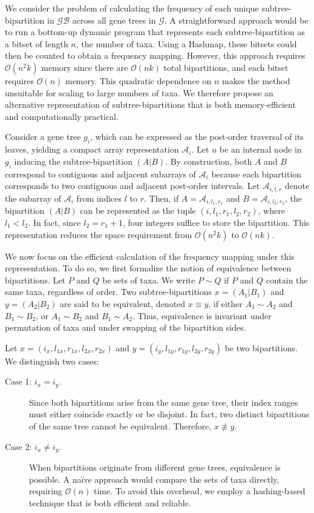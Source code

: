 \documentclass[runningheads]{llncs}
\begin{document}
We consider the problem of calculating the frequency of each unique subtree-bipartition in $\mathcal{GB}$ across all gene trees in $\mathcal{G}$. A straightforward approach would be to run a bottom-up dynamic program that represents each subtree-bipartition as a bitset of length $n$, the number of taxa. Using a Hashmap, these bitsets could then be counted to obtain a frequency mapping. However, this approach requires $\mathcal{O}(n^{2}k)$ memory since there are $\mathcal{O}(nk)$ total bipartitions, and each bitset requires $\mathcal{O}(n)$ memory. This quadratic dependence on $n$ makes the method unsuitable for scaling to large numbers of taxa. We therefore propose an alternative representation of subtree-bipartitions that is both memory-efficient and computationally practical.

Consider a gene tree $g_i$, which can be expressed as the post-order traversal of its leaves, yielding a compact array representation $\mathcal{A}_i$. Let $u$ be an internal node in $g_i$ inducing the subtree-bipartition $(A|B)$. By construction, both $A$ and $B$ correspond to contiguous and adjacent subarrays of $\mathcal{A}_i$ because each bipartition corresponds to two contiguous and adjacent post-order intervals. Let $\mathcal{A}_{i,l,r}$ denote the subarray of $\mathcal{A}_i$ from indices $l$ to $r$. Then, if $A = \mathcal{A}_{i,l_1,r_1}$ and $B = \mathcal{A}_{i,l_2,r_2}$, the bipartition $(A|B)$ can be represented as the tuple $(i,l_1,r_1,l_2,r_2)$, where $l_1 < l_2$. In fact, since $l_2 = r_1 + 1$, four integers suffice to store the bipartition. This representation reduces the space requirement from $\mathcal{O}(n^{2}k)$ to $\mathcal{O}(nk)$.

We now focus on the efficient calculation of the frequency mapping under this representation. To do so, we first formalize the notion of equivalence between bipartitions. Let $P$ and $Q$ be sets of taxa. We write $P \sim Q$ if $P$ and $Q$ contain the same taxa, regardless of order. Two subtree-bipartitions $x = (A_1|B_1)$ and $y = (A_2|B_2)$ are said to be equivalent, denoted $x \equiv y$, if either $A_1 \sim A_2$ and $B_1 \sim B_2$, or $A_1 \sim B_2$ and $B_1 \sim A_2$. Thus, equivalence is invariant under permutation of taxa and under swapping of the bipartition sides.

Let $x = (i_x,l_{1x},r_{1x},l_{2x},r_{2x})$ and $y = (i_y,l_{1y},r_{1y},l_{2y},r_{2y})$ be two bipartitions. We distinguish two cases:
\begin{description}
    \item[Case 1: $i_x = i_y$.] Since both bipartitions arise from the same gene tree, their index ranges must either coincide exactly or be disjoint. In fact, two distinct bipartitions of the same tree cannot be equivalent. Therefore, $x \not\equiv y$.
    
    \item[Case 2: $i_x \neq i_y$.] When bipartitions originate from different gene trees, equivalence is possible. A naïve approach would compare the sets of taxa directly, requiring $\mathcal{O}(n)$ time. To avoid this overhead, we employ a hashing-based technique that is both efficient and reliable.
\end{description}
\end{document}
